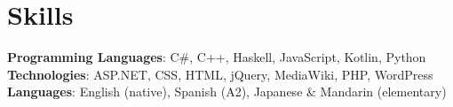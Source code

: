 \section{Skills}
\begin{itemize}[leftmargin=0.15in, label={}]
\small{\item{
    \textbf{Programming Languages}{: C\#, C++, Haskell, JavaScript, Kotlin, Python} \\
    \textbf{Technologies}{: ASP.NET, CSS, HTML, jQuery, MediaWiki, PHP, WordPress} \\
    \textbf{Languages}{: English (native), Spanish (A2), Japanese \& Mandarin (elementary)} \\
}}
\end{itemize}